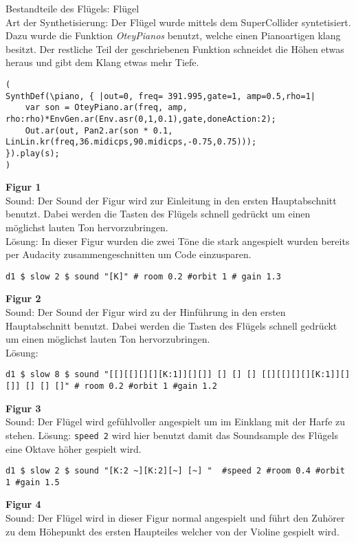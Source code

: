 \documentclass[
10pt, %
a4paper, %
oneside, %
headinclude,footinclude, %
BCOR5mm, %
]{scrartcl}
\begin{document}
\noindent Bestandteile des Flügels: Flügel\\
Art der Synthetisierung: Der Flügel wurde mittels dem SuperCollider syntetisiert. Dazu wurde die Funktion \textit{OteyPianos} benutzt, welche einen Pianoartigen klang besitzt. Der restliche Teil der geschriebenen Funktion schneidet die Höhen etwas heraus und gibt dem Klang etwas mehr Tiefe. 
\begin{lstlisting}
(
SynthDef(\piano, { |out=0, freq= 391.995,gate=1, amp=0.5,rho=1|
    var son = OteyPiano.ar(freq, amp, rho:rho)*EnvGen.ar(Env.asr(0,1,0.1),gate,doneAction:2);
    Out.ar(out, Pan2.ar(son * 0.1, LinLin.kr(freq,36.midicps,90.midicps,-0.75,0.75)));
}).play(s);
)
\end{lstlisting}
\noindent \textbf{Figur 1}\\
Sound: Der Sound der Figur wird zur Einleitung in den ersten Hauptabschnitt benutzt. Dabei werden die Tasten des Flügels 
schnell gedrückt um einen möglichst lauten Ton hervorzubringen.\\
Lösung: In dieser Figur wurden die zwei Töne die stark angespielt wurden bereits per Audacity zusammengeschnitten um Code einzusparen.
\begin{lstlisting}
d1 $ slow 2 $ sound "[K]" # room 0.2 #orbit 1 # gain 1.3
\end{lstlisting}
\noindent \textbf{Figur 2}\\
Sound: Der Sound der Figur wird zu der Hinführung in den ersten Hauptabschnitt benutzt. Dabei werden die Tasten des Flügels 
schnell gedrückt um einen möglichst lauten Ton hervorzubringen.\\
Lösung:
\begin{lstlisting}
d1 $ slow 8 $ sound "[[][[][][][K:1]][][]] [] [] [] [[][[][][][K:1]][][]] [] [] []" # room 0.2 #orbit 1 #gain 1.2
\end{lstlisting}
\noindent \textbf{Figur 3}\\
Sound: Der Flügel wird gefühlvoller angespielt um im Einklang mit der Harfe zu stehen.
Lösung: \verb|speed 2| wird hier benutzt damit das Soundsample des Flügels eine Oktave höher gespielt wird.
\begin{lstlisting}
d1 $ slow 2 $ sound "[K:2 ~][K:2][~] [~] "  #speed 2 #room 0.4 #orbit 1 #gain 1.5
\end{lstlisting}
\noindent \textbf{Figur 4}\\
Sound: Der Flügel wird in dieser Figur normal angespielt und führt den Zuhörer zu dem Höhepunkt des ersten Haupteiles welcher von der Violine gespielt wird.\\
\end{document}
